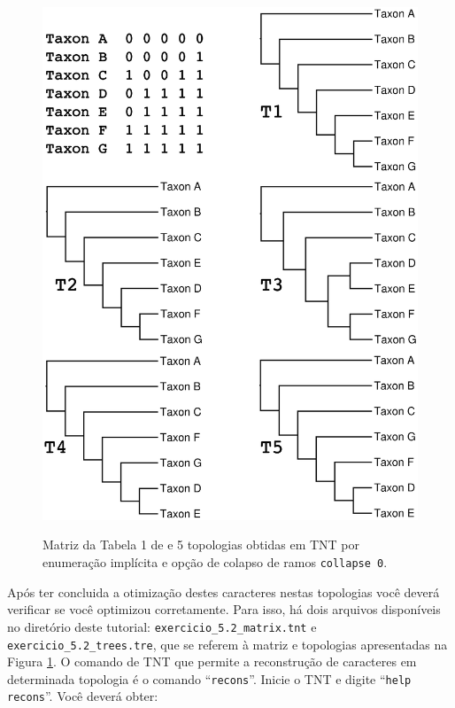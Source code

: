 \begin{refsection}
  \begin{figure}[H]
      {\includegraphics[scale=0.75]{figures/tut5/coddington_and_scharff_col0_trees.eps}}
	{\caption[\textcite{Coddington_and_Scharff_1994} exemplo]{Matriz da Tabela 1 de \textcite{Coddington_and_Scharff_1994} e 5 topologias obtidas em TNT por enumeração implícita e opção de colapso de ramos \texttt{collapse 0}.}\label{tut5:fig:optimization}} 
  \end{figure}


Após ter concluida a otimização destes caracteres nestas topologias você deverá verificar se você optimizou corretamente. Para isso, há dois arquivos disponíveis no diretório deste tutorial: \texttt{exercicio\_5.2\_matrix.tnt} e \texttt{exercicio\_5.2\_trees.tre}, que se referem à matriz e topologias apresentadas na Figura \ref{tut5:fig:optimization}. O comando de TNT que permite a reconstrução de caracteres em determinada topologia é o comando ``\texttt{recons}''. Inicie o TNT e digite ``\texttt{help recons}''. Você deverá obter:


\end{refsection}

